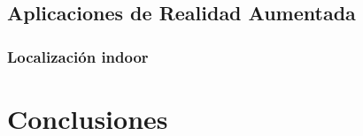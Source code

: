 \documentclass[a4paper, 12pt]{book}
\begin{document}
\section{Aplicaciones de Realidad Aumentada}
\label{sec:aplicacionesdesarrolladas}

\subsection{Localización indoor}
\label{sec:localizacionindoor}

\chapter{Conclusiones}
\label{sec:conclusiones}

\cleardoublepage

%
%  
\end{document}
